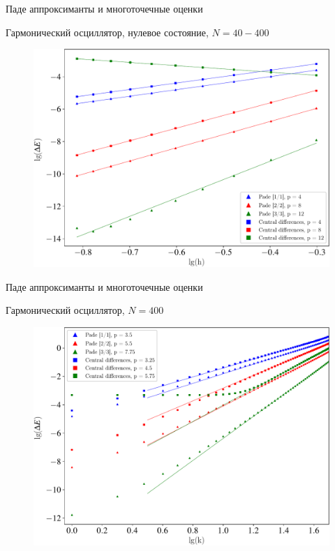 \documentclass[10pt,pdf,hyperref={unicode},xcolor=dvipsnames]{beamer}
\begin{document}
\begin{frame}{Паде аппроксиманты и многоточечные оценки}
    \vspace*{-0.3cm}
    \begin{block}{Гармонический осциллятор, нулевое состояние, $N = 40-400$}
        \begin{figure}
            \includegraphics[width=0.8\linewidth]{./pictures/pade_vs_cs-crop.pdf}
        \end{figure}
    \end{block}
\end{frame}

\begin{frame}{Паде аппроксиманты и многоточечные оценки}
    \vspace*{-0.3cm}
    \begin{block}{Гармонический осциллятор, $N = 400$}
        \begin{figure}
            \includegraphics[width=0.8\linewidth]{./pictures/pade_vs_cd_diff_k-crop.pdf}
        \end{figure}
    \end{block}
\end{frame}
\end{document}
